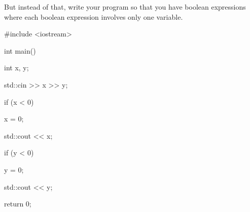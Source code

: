 But instead of that, write your program so that you have boolean expressions where each boolean expression involves only one variable.

\begin{console}

#include  <iostream>



int main()

{

    int x, y;

    std::cin >> x >> y;

    if (x < 0)

    {

        x = 0;

    }



    std::cout << x;



    if (y < 0)

    {

        y = 0;

    }

    

    std::cout << y;



    return 0;

} 

\end{console}


